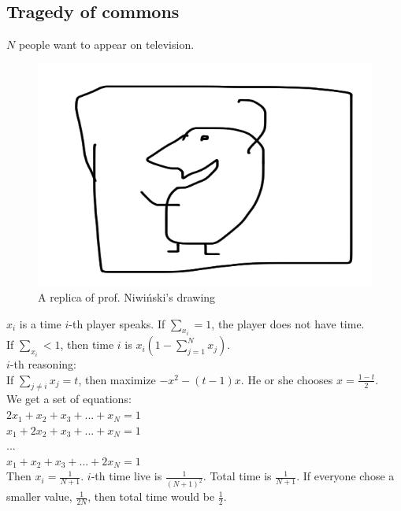 \subsection*{Tragedy of commons}
$N$ people want to appear on television.
\begin{figure}[H]
    \centering
    \caption{A replica of prof. Niwiński's drawing}
    \includegraphics[scale=0.1]{content/graphics/game24.png}
\end{figure}
\noindent
$x_i$ is a time $i$-th player speaks. If $\sum_{x_i} = 1$, the player does not have time.\\
If $\sum_{x_i} < 1$, then time $i$ is $x_i (1 - \sum_{j=1}^{N} x_j)$.\\
$i$-th reasoning:\\
If $\sum_{j \neq i} x_j = t$, then maximize $-x^2 - (t-1)x$. He or she chooses $x = \frac{1-t}{2}$.\\
We get a set of equations:\\
$2x_1 + x_2 + x_3 + ... + x_N = 1$\\
$x_1 + 2x_2 + x_3 + ... + x_N = 1$\\
...\\
$x_1 + x_2 + x_3 + ... + 2x_N = 1$\\
Then $x_i = \frac{1}{N+1}$. $i$-th time live is $\frac{1}{(N+1)^2}$. Total time is $\frac{1}{N+1}$.
If everyone chose a smaller value, $\frac{1}{2N}$, then total time would be $\frac{1}{2}$.